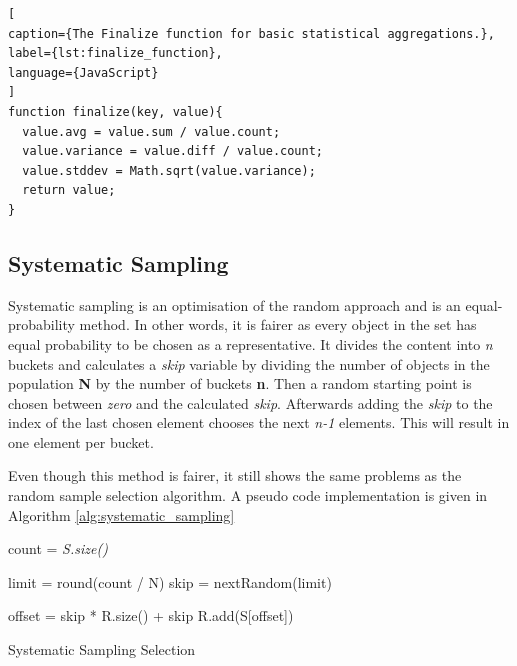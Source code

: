 \begin{lstlisting}[
caption={The Finalize function for basic statistical aggregations.},
label={lst:finalize_function},
language={JavaScript}
]
function finalize(key, value){
  value.avg = value.sum / value.count;
  value.variance = value.diff / value.count;
  value.stddev = Math.sqrt(value.variance);
  return value;
}
\end{lstlisting}

\subsection{Systematic Sampling}
Systematic sampling is an optimisation of the random approach and is an equal-probability method. In other words, it is fairer as every object in the set has equal probability to be chosen as a representative. It divides the content into \textit{n} buckets and calculates a \textit{skip} variable by dividing the number of objects in the population \textbf{N} by the number of buckets \textbf{n}. Then a random starting point is chosen between \textit{zero} and the calculated \textit{skip}. Afterwards adding the \textit{skip} to the index of the last chosen element chooses the next \textit{n-1} elements.  This will result in one element per bucket.

Even though this method is fairer, it still shows the same problems as the random sample selection algorithm. A pseudo code implementation is given in Algorithm \ref{alg:systematic_sampling}

\begin{algorithm}[!htb]
\SetAlgoLined
{}

 \BlankLine

 count = \textit{S.size()}\; 
 
 limit = round(count / N)\;
  skip = nextRandom(limit)\;
  
   {
     offset = skip * R.size() + skip\;
     R.add(S[offset])\;
  }
 \caption{Systematic Sampling Selection}
 \label{alg:systematic_sampling}
\end{algorithm}

\pagebreak
